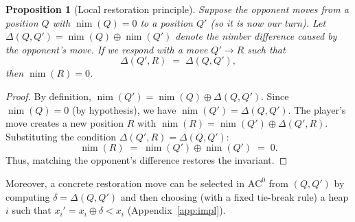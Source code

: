 \documentclass[11pt]{article}
\newcommand{\AC}{\mathrm{AC}}
\theoremstyle{plain}
\newtheorem{proposition}[theorem]{Proposition}
\theoremstyle{definition}
\theoremstyle{remark}
\numberwithin{equation}{section}
\begin{document}
\begin{proposition}[Local restoration principle]
\label{prop:restore}
Suppose the \emph{opponent} moves from a position $Q$ with $\operatorname{nim}(Q)=0$ to a position $Q'$ (so it is now our turn).
Let $\Delta(Q,Q')=\operatorname{nim}(Q)\oplus \operatorname{nim}(Q')$ denote the nimber difference caused by the opponent's move.
If we respond with a move $Q' \to R$ such that
\[
\Delta(Q',R) \;=\; \Delta(Q,Q'),
\]
then $\operatorname{nim}(R)=0$.
\end{proposition}

\begin{proof}
By definition, $\operatorname{nim}(Q') = \operatorname{nim}(Q) \oplus \Delta(Q,Q')$.
Since $\operatorname{nim}(Q)=0$ (by hypothesis), we have $\operatorname{nim}(Q') = \Delta(Q,Q')$.
The player's move creates a new position $R$ with $\operatorname{nim}(R) = \operatorname{nim}(Q') \oplus \Delta(Q',R)$.
Substituting the condition $\Delta(Q',R) = \Delta(Q,Q')$:
\[
\operatorname{nim}(R) \;=\; \operatorname{nim}(Q') \oplus \operatorname{nim}(Q') \;=\; 0.
\]
Thus, matching the opponent's difference restores the invariant.
\end{proof}

Moreover, a concrete restoration move can be selected in $\AC^0$ from $(Q,Q')$ by computing $\delta=\Delta(Q,Q')$ and then choosing (with a fixed tie-break rule) a heap $i$ such that $x_i' = x_i \oplus \delta < x_i$ (Appendix~\ref{app:impl}).
\end{document}
